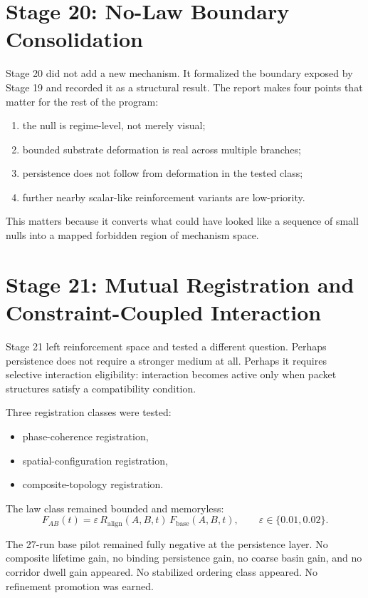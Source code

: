 \documentclass[11pt]{article}
\begin{document}
\section{Stage 20: No-Law Boundary Consolidation}

Stage 20 did not add a new mechanism. It formalized the boundary exposed by Stage 19 and recorded it as a structural result. The report makes four points that matter for the rest of the program:
\begin{enumerate}
\item the null is regime-level, not merely visual;
\item bounded substrate deformation is real across multiple branches;
\item persistence does not follow from deformation in the tested class;
\item further nearby scalar-like reinforcement variants are low-priority.
\end{enumerate}

This matters because it converts what could have looked like a sequence of small nulls into a mapped forbidden region of mechanism space.

\section{Stage 21: Mutual Registration and Constraint-Coupled Interaction}

Stage 21 left reinforcement space and tested a different question. Perhaps persistence does not require a stronger medium at all. Perhaps it requires selective interaction eligibility: interaction becomes active only when packet structures satisfy a compatibility condition.

Three registration classes were tested:
\begin{itemize}
\item phase-coherence registration,
\item spatial-configuration registration,
\item composite-topology registration.
\end{itemize}
The law class remained bounded and memoryless:
\[
F_{AB}(t)=\varepsilon\,R_{\mathrm{align}}(A,B,t)\,F_{\mathrm{base}}(A,B,t),
\qquad \varepsilon\in\{0.01,0.02\}.
\]

The 27-run base pilot remained fully negative at the persistence layer. No composite lifetime gain, no binding persistence gain, no coarse basin gain, and no corridor dwell gain appeared. No stabilized ordering class appeared. No refinement promotion was earned.
\end{document}
